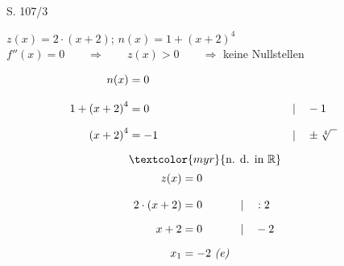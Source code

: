 \begin{Exercise}{S. 107/3}{}
\begin{enumerate}
\begin{enumerate}[label=\alph*),leftmargin=*]
{\begin{itemize}[leftmargin=*]
{                    $z(x) = 2 \cdot \left(x + 2\right)$; \qquad $n(x) = 1 + \left(x+2\right)^{4}$\\[1.0ex]
                    $f''(x) = 0 \qquad \Rightarrow \qquad z(x) > 0 \qquad \Rightarrow$ \quad keine Nullstellen\\[1.0ex]
                    \begin{minipage}[t]{0.4\linewidth}
                        \vspace{-2.0ex}
                        \begin{align*}
                            n(x) &= 0 \\[2.0ex]
                            1 + \left(x+2\right)^{4} &= 0 &&| \quad - 1\\[1.5ex]
                            \left(x+2\right)^{4} &= -1 &&| \quad \pm \sqrt[4]{\phantom{x}}\\[1.5ex]
                            & \textcolor{myr}{\text{n. d. in } \mathbb{R}}\\[-1.5ex]
                        \end{align*}
                    \end{minipage}
                    \hfill
                    \begin{minipage}[t]{0.55\linewidth}
                        \vspace{-2.0ex}
                        \begin{align*}
                            z(x) &= 0\\[2.0ex]
                            2 \cdot \left(x + 2\right) &= 0 &&| \quad :2\\[1.5ex]
                            x + 2 &= 0 &&| \quad -2\\[1.5ex]
                            x_{1} &= -2 \ \text{\textit{(e)}}&&\\[-2.0ex]
                        \end{align*}
                    \end{minipage}
                    }
\end{itemize}}
\end{enumerate}
\end{enumerate}
\end{Exercise}
